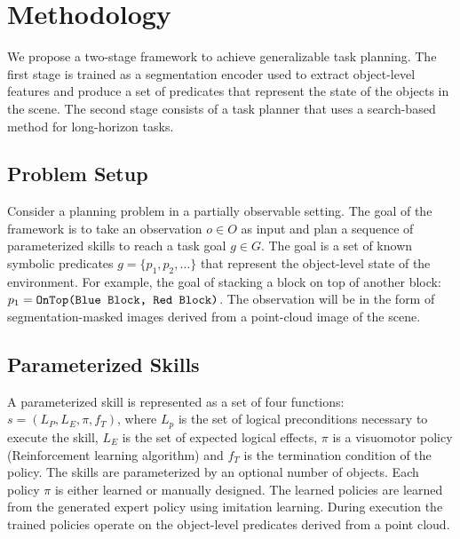 \documentclass[
	a4paper, %
	10pt, %
	unnumberedsections, %
	twoside, %
]{LTJournalArticle}
\begin{document}

\section{Methodology}

We propose a two-stage framework to achieve generalizable task planning. The first stage is trained as a segmentation encoder used to 
extract object-level features and produce a set of predicates that represent the state of the objects in the scene. The second stage 
consists of a task planner that uses a search-based method for long-horizon tasks. 

\subsection{Problem Setup}

Consider a planning problem in a partially observable setting. The goal of the framework is to take an observation \(o \in O\) as 
input and plan a sequence of parameterized skills to reach a task goal \(g \in G\). The goal is a set of known symbolic 
predicates \(g = \{p_1, p_2,\dots\}\) that represent the object-level state of the environment. For example, the goal of stacking a 
block on top of another block: \( p_1 = \verb|OnTop(Blue Block, Red Block)|\). The observation will be in the form of segmentation-masked 
images derived from a point-cloud image of the scene. 

\subsection{Parameterized Skills}

A parameterized skill is represented as a set of four functions: \(s = (L_P, L_E, \pi, f_T)\), where \(L_p\) is the set of logical 
preconditions necessary to execute the skill, \(L_E\) is the set of expected logical effects, \(\pi\) is a visuomotor policy 
(Reinforcement learning algorithm) and \(f_T\) is the termination condition of the policy. The skills are parameterized by an optional 
number of objects. Each policy \(\pi\) is either learned or manually designed. The learned policies are learned from the generated expert
policy using imitation learning. During execution the trained policies operate on the object-level predicates derived from a point cloud.
\end{document}
